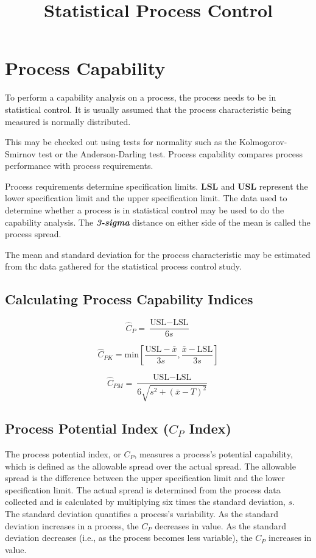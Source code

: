 \documentclass[12pt]{article}
\title{Statistical Process Control}
\begin{document}
\section*{Process Capability}

To perform a capability analysis on a process, the process needs to be in statistical control. It is
usually assumed that the process characteristic being measured is normally distributed. 

This may be
checked out using tests for normality such as the Kolmogorov-Smirnov test or the
Anderson-Darling test. Process capability compares process performance with process requirements.

Process requirements determine specification limits. \textbf{LSL} and \textbf{USL} represent the lower specification limit and the upper specification limit.
The data used to determine whether a process is in statistical control may be used to do the
capability analysis. The \textit{\textbf{3-sigma}} distance on either side of the mean is called the process spread. 

The
mean and standard deviation for the proccss characteristic may be estimated from thc data gathered for
the statistical process control study.

\subsection*{Calculating Process Capability Indices}
\[ \hat{C}_P = \frac{\mbox{USL} - \mbox{LSL}}{6s}\]

\[ \hat{C}_{PK} = \mbox{min} \left[\frac{\mbox{USL} - \bar{x}}{3s},\frac{\bar{x} - \mbox{LSL}}{3s} \right] \]

\[ \hat{C}_{PM} = \frac{\mbox{USL} - \mbox{LSL}}{6\sqrt{s^2+(\bar{x}-T)^2}}\]
\bigskip

\subsection*{Process Potential Index ($C_P$ Index)}

The process potential index, or $C_P$, measures a process's potential capability, which is defined as the allowable spread over the actual spread. The allowable spread is the difference between the upper specification limit and the lower specification limit. The actual spread is determined from the process data collected and is calculated by multiplying six times the standard deviation, $s$. The standard deviation quantifies a process's variability. As the standard deviation increases in a process, the $C_P$ decreases in value. As the standard deviation decreases (i.e., as the process becomes less variable), the $C_P$ increases in value.
\end{document}
